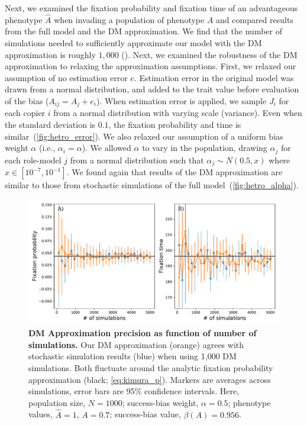 \documentclass[12pt]{extarticle}
\begin{document}
Next, we examined the fixation probability and fixation time of an advantageous phenotype $\hat{A}$ when invading a population of phenotype $A$ and compared results from the full model and the DM approximation.
We find that the number of simulations needed to sufficiently approximate our model with the DM approximation is roughly $1,000$ ().
Next, we examined the robustness of the DM approximation to relaxing the approximation assumptions.
First, we relaxed our assumption of no estimation error $e$.
Estimation error in the original model was drawn from a normal distribution, and added to the trait value before evaluation of the bias ($A_{ij} = A_j + e_i$).
When estimation error is applied, we sample $J_i$ for each copier $i$ from a normal distribution with varying scale (variance).
Even when the standard deviation is $0.1$, the fixation probability and time is similar~(\cref{fig:hetro_error}). 
We also relaxed our assumption of a uniform bias weight $\alpha$ (i.e., $\alpha_i=\alpha$). We allowed $\alpha$ to vary in the population, drawing $\alpha_j$ for each role-model $j$ from a normal distribution such that $\alpha_j \sim N(0.5,x)$ where $x \in [10^{-7},10^{-1}]$. 
We found again that results of the DM approximation are similar to those from stochastic simulations of the full model~(\cref{fig:hetro_alpha}).



\begin{figure}[h]
    \includegraphics[width=\linewidth]{../figures/final/num_sims.pdf}
  \caption{
  \textbf{DM Approximation precision as function of number of simulations.}
  Our DM approximation (orange) agrees with stochastic simulation results (blue) when using 1,000 DM simulations. %
  Both fluctuate around the analytic fixation probability approximation (black; \cref{eq:kimura_p}).
  Markers are averages across simulations, error bars are 95\% confidence intervals.
  Here, population size, $N=1000$; success-bias weight, $\alpha=0.5$; phenotype values, $\hat{A}=1$, $A=0.7$; success-bias value, $\beta(A)=0.956$.}	
  \label{fig:num_sims}
\end{figure}
\end{document}
